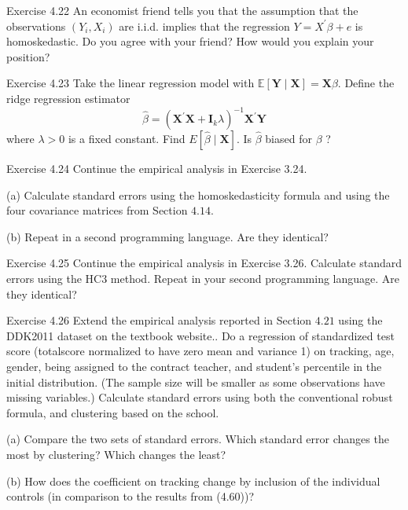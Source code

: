 \documentclass[10pt]{article}
\begin{document}
Exercise 4.22 An economist friend tells you that the assumption that the observations $\left(Y_{i}, X_{i}\right)$ are i.i.d. implies that the regression $Y=X^{\prime} \beta+e$ is homoskedastic. Do you agree with your friend? How would you explain your position?

Exercise 4.23 Take the linear regression model with $\mathbb{E}[\boldsymbol{Y} \mid \boldsymbol{X}]=\boldsymbol{X} \beta$. Define the ridge regression estimator
$$
\widehat{\beta}=\left(\boldsymbol{X}^{\prime} \boldsymbol{X}+\boldsymbol{I}_{k} \lambda\right)^{-1} \boldsymbol{X}^{\prime} \boldsymbol{Y}
$$
where $\lambda>0$ is a fixed constant. Find $E[\widehat{\beta} \mid \boldsymbol{X}]$. Is $\widehat{\beta}$ biased for $\beta$ ?

Exercise 4.24 Continue the empirical analysis in Exercise 3.24.

(a) Calculate standard errors using the homoskedasticity formula and using the four covariance matrices from Section $4.14 .$

(b) Repeat in a second programming language. Are they identical?

Exercise 4.25 Continue the empirical analysis in Exercise 3.26. Calculate standard errors using the HC3 method. Repeat in your second programming language. Are they identical?

Exercise 4.26 Extend the empirical analysis reported in Section $4.21$ using the DDK2011 dataset on the textbook website.. Do a regression of standardized test score (totalscore normalized to have zero mean and variance 1) on tracking, age, gender, being assigned to the contract teacher, and student's percentile in the initial distribution. (The sample size will be smaller as some observations have missing variables.) Calculate standard errors using both the conventional robust formula, and clustering based on the school.

(a) Compare the two sets of standard errors. Which standard error changes the most by clustering? Which changes the least?

(b) How does the coefficient on tracking change by inclusion of the individual controls (in comparison to the results from (4.60))?
\end{document}
